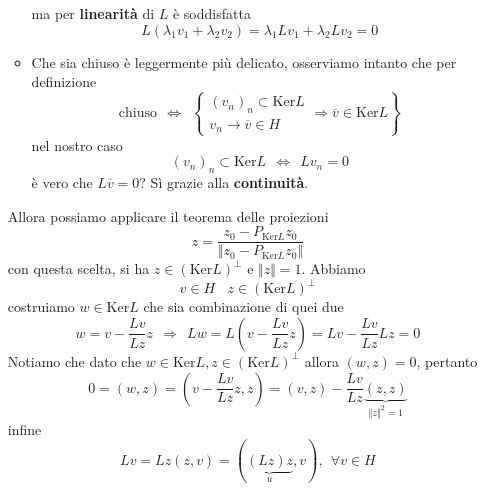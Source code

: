 \documentclass[10pt,a4paper,twoside,openright]{book}
\begin{document}
\begin{dimostrazione}
\begin{itemize}
\begin{itemize}
                        ma per \textbf{linearità} di $L$ è soddisfatta
                        \begin{equation*}
                            L(\lambda _{1} v_{1} +\lambda _{2} v_{2}) =\lambda _{1} Lv_{1} +\lambda _{2} Lv_{2} =0
                        \end{equation*}
                  \item Che sia chiuso è leggermente più delicato, osserviamo intanto che per definizione
                        \begin{equation*}
                            \text{chiuso} \ \ \Leftrightarrow \ \ \left\{
                            \begin{array}{ l }
                                (v_{n})_{n} \subset \mathrm{Ker} L \\
                                v_{n}\rightarrow \overline{v} \in H
                            \end{array} \Rightarrow \overline{v} \in \mathrm{Ker} L\right\}
                        \end{equation*}nel nostro caso
                        \begin{equation*}
                            (v_{n})_{n} \subset \mathrm{Ker} L\ \ \Leftrightarrow \ \ Lv_{n} =0
                        \end{equation*}è vero che $L\overline{v} =0$? Sì grazie alla \textbf{continuità}.
              \end{itemize}

              Allora possiamo applicare il teorema delle proiezioni
              \begin{equation*}
                  z=\frac{z_{0} -P_{\mathrm{Ker} L} z_{0}}{\Vert z_{0} -P_{\mathrm{Ker} L} z_{0}\Vert }
              \end{equation*}con questa scelta, si ha $\boxed{z\in (\mathrm{Ker} L)^{\perp }}$ e $\Vert z\Vert =1$. Abbiamo
              \begin{equation*}
                  v\in H\ \ \ \ z\in (\mathrm{Ker} L)^{\perp }
              \end{equation*}costruiamo $\boxed{w\in \mathrm{Ker} L}$ che sia combinazione di quei due
              \begin{equation*}
                  w=v-\frac{Lv}{Lz} z\ \ \Rightarrow \ \ Lw=L\left(v-\frac{Lv}{Lz} z\right) =Lv-\frac{Lv}{Lz} Lz=0
              \end{equation*}Notiamo che dato che $w\in \mathrm{Ker} L,z\in (\mathrm{Ker} L)^{\perp }$ allora $(w,z) =0$, pertanto
              \begin{equation*}
                  0=(w,z) =\left(v-\frac{Lv}{Lz} z,z\right) =(v,z) -\frac{Lv}{Lz}\underbrace{(z,z)}_{\Vert z\Vert ^{2} =1}
              \end{equation*}infine
              \begin{equation*}
                  Lv=Lz(z,v) =(\underbrace{(Lz) z}_{u},v),\ \ \forall v\in H
              \end{equation*}
    \end{itemize}


\end{dimostrazione}
\end{document}
